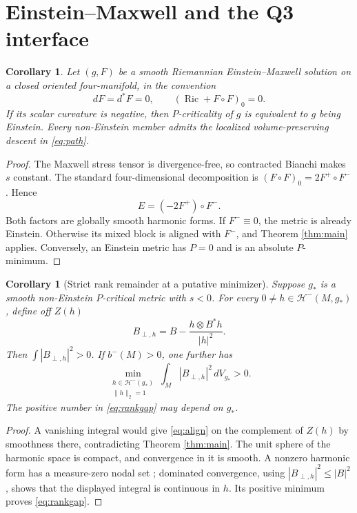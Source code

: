 \documentclass[11pt,a4paper]{article}
\newtheorem{corollary}[theorem]{Corollary}
\theoremstyle{remark}\newtheorem{remark}[theorem]{Remark}
\newcommand{\Ric}{\operatorname{Ric}}
\newcommand{\Hharm}{\mathcal H}
\numberwithin{equation}{section}
\begin{document}
\section{Einstein--Maxwell and the Q3 interface}

\begin{corollary}\label{cor:EM}
Let $(g,F)$ be a smooth Riemannian Einstein--Maxwell solution on a closed
oriented four-manifold, in the convention
\[
 dF=d^*F=0,\qquad (\Ric+F\circ F)_0=0.
\]
If its scalar curvature is negative, then $P$-criticality of $g$ is
equivalent to $g$ being Einstein. Every non-Einstein member admits the
localized volume-preserving descent in \eqref{eq:path}.
\end{corollary}
\begin{proof}
The Maxwell stress tensor is divergence-free, so contracted Bianchi makes
$s$ constant. The standard four-dimensional decomposition \cite{LeBrunEM}
is $(F\circ F)_0=2F^+\circ F^-$. Hence
\[
 E=(-2F^+)\circ F^-.
\]
Both factors are globally smooth harmonic forms. If $F^-\equiv0$, the
metric is already Einstein. Otherwise its mixed block is aligned with
$F^-$, and Theorem \ref{thm:main} applies. Conversely, an Einstein metric
has $P=0$ and is an absolute $P$-minimum.
\end{proof}

\begin{corollary}[Strict rank remainder at a putative minimizer]
Suppose $g_*$ is a smooth non-Einstein $P$-critical metric with $s<0$.
For every $0\ne h\in\Hharm^-(M,g_*)$, define off $Z(h)$
\[
 B_{\perp,h}=B-\frac{h\otimes B^*h}{|h|^2}.
\]
Then $\int|B_{\perp,h}|^2>0$. If $b^-(M)>0$, one further has
\begin{equation}\label{eq:rankgap}
 \min_{\substack{h\in\Hharm^-(g_*)\\\|h\|_2=1}}
       \int_M|B_{\perp,h}|^2\,dV_{g_*}>0.
\end{equation}
The positive number in \eqref{eq:rankgap} may depend on $g_*$.
\end{corollary}
\begin{proof}
A vanishing integral would give \eqref{eq:align} on the complement of
$Z(h)$ by smoothness there, contradicting Theorem \ref{thm:main}.
The unit sphere of the harmonic space is compact, and convergence in it
is smooth. A nonzero harmonic form has a measure-zero nodal set
\cite{Baer}; dominated convergence, using $|B_{\perp,h}|^2\le|B|^2$,
shows that the displayed integral is continuous in $h$. Its positive
minimum proves \eqref{eq:rankgap}.
\end{proof}
\end{document}
